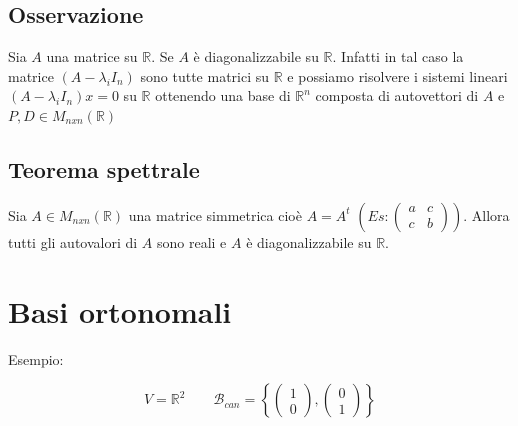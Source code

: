 \documentclass[12pt]{article}
\begin{document}
\subsection{Osservazione}

Sia $A$ una matrice su $\mathbb{R}$. Se $A$ è diagonalizzabile su $\mathbb{R}$. Infatti in tal caso la matrice $(A - \lambda_i I_n)$ sono tutte matrici su $\mathbb{R}$ e possiamo risolvere i sistemi lineari $(A - \lambda_i I_n)x = 0$ su $\mathbb{R}$ ottenendo una base di $\mathbb{R}^n$ composta di autovettori di $A$ e $P, D \in M_{nxn}(\mathbb{R})$

\subsection{Teorema spettrale}
Sia $A \in M_{nxn} (\mathbb{R})$ una matrice simmetrica cioè $A = A^t$ $\left(Es: \begin{pmatrix}
    a & c\\
    c & b
\end{pmatrix}\right)$. Allora tutti gli autovalori di $A$ sono reali e $A$ è diagonalizzabile su $\mathbb{R}$.

\section{Basi ortonomali}

Esempio:


\[V = \mathbb{R}^2 \quad \quad \mathcal{B}_{can} = \left\{\begin{pmatrix}
    1\\
    0
\end{pmatrix}, \begin{pmatrix}
    0\\
    1
\end{pmatrix}\right\}\]

\begin{figure}[H]
\centering
{}
\end{figure}
\end{document}
